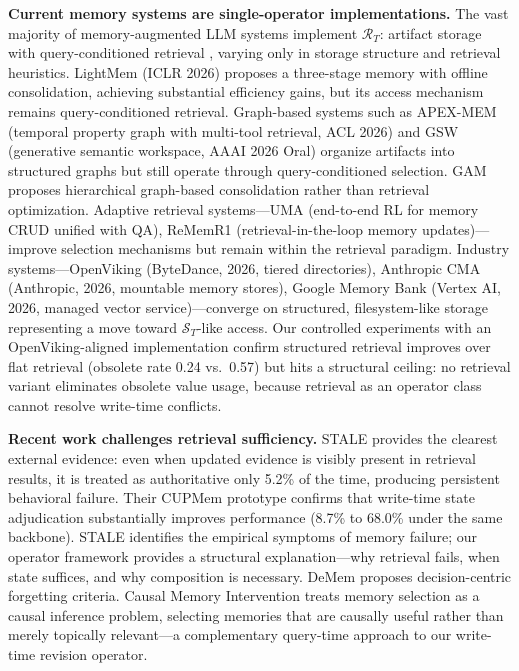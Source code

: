 \documentclass[letterpaper,twocolumn,10pt]{article}
\begin{document}
\textbf{Current memory systems are single-operator implementations.} The vast majority of memory-augmented LLM systems implement $\mathcal{R}_T$: artifact storage with query-conditioned retrieval \cite{lewis2020rag,chhikara2025mem0,rasmussen2025zep}, varying only in storage structure and retrieval heuristics. LightMem \cite{fang2026lightmem} (ICLR 2026) proposes a three-stage memory with offline consolidation, achieving substantial efficiency gains, but its access mechanism remains query-conditioned retrieval. Graph-based systems such as APEX-MEM \cite{banerjee2026apexmem} (temporal property graph with multi-tool retrieval, ACL 2026) and GSW \cite{rajesh2025gsw} (generative semantic workspace, AAAI 2026 Oral) organize artifacts into structured graphs but still operate through query-conditioned selection. GAM \cite{wu2026gam} proposes hierarchical graph-based consolidation rather than retrieval optimization. Adaptive retrieval systems---UMA \cite{zhang2026uma} (end-to-end RL for memory CRUD unified with QA), ReMemR1 \cite{shi2025rememr1} (retrieval-in-the-loop memory updates)---improve selection mechanisms but remain within the retrieval paradigm. Industry systems---OpenViking \cite{bytedance2026openviking} (ByteDance, 2026, tiered directories), Anthropic CMA \cite{anthropic2026cma} (Anthropic, 2026, mountable memory stores), Google Memory Bank \cite{google2026memorybank} (Vertex AI, 2026, managed vector service)---converge on structured, filesystem-like storage representing a move toward $\mathcal{S}_T$-like access. Our controlled experiments with an OpenViking-aligned implementation confirm structured retrieval improves over flat retrieval (obsolete rate 0.24 vs.\ 0.57) but hits a structural ceiling: no retrieval variant eliminates obsolete value usage, because retrieval as an operator class cannot resolve write-time conflicts.

\textbf{Recent work challenges retrieval sufficiency.} STALE \cite{chao2026stale} provides the clearest external evidence: even when updated evidence is visibly present in retrieval results, it is treated as authoritative only 5.2\% of the time, producing persistent behavioral failure. Their CUPMem prototype confirms that write-time state adjudication substantially improves performance (8.7\% to 68.0\% under the same backbone). STALE identifies the empirical symptoms of memory failure; our operator framework provides a structural explanation---why retrieval fails, when state suffices, and why composition is necessary. DeMem \cite{zou2026demem} proposes decision-centric forgetting criteria. Causal Memory Intervention \cite{srivastava2026causal} treats memory selection as a causal inference problem, selecting memories that are causally useful rather than merely topically relevant---a complementary query-time approach to our write-time revision operator.
\end{document}
